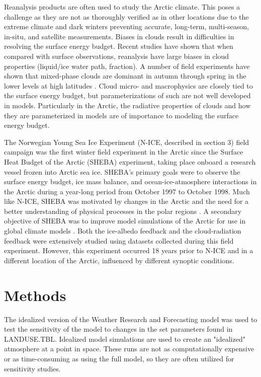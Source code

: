 Reanalysis products are often used to study the Arctic climate. This poses a challenge as they are not as thoroughly verified as in other locations due to the extreme climate and dark winters preventing accurate, long-term, multi-season, in-situ, and satellite measurements. Biases in clouds result in difficulties in resolving the surface energy budget. Recent studies have shown that when compared with surface observations, reanalysis have large biases in cloud properties (liquid/ice water path, fraction). A number of field experiments have shown that mixed-phase clouds are dominant in autumn through spring in the lower levels at high latitudes \citep{intrieri:2002, wang:2005}. Cloud micro- and macrophysics are closely tied to the surface energy budget, but parameterizations of such are not well developed in models. Particularly in the Arctic, the radiative properties of clouds and how they are parameterized in models are of importance to modeling the surface energy budget. 

The  Norwegian Young Sea Ice Experiment (N-ICE, described in section 3) field campaign was the first winter field experiment in the Arctic since the Surface Heat Budget of the Arctic (SHEBA) experiment, taking place onboard a research vessel frozen into Arctic sea ice. SHEBA’s primary goals were to observe the surface energy budget, ice mass balance, and ocean-ice-atmosphere interactions in the Arctic during a year-long period from October 1997 to October 1998. Much like N-ICE, SHEBA was motivated by changes in the Arctic and the need for a better understanding of physical processes in the polar regions \citep{randall:1998}. A secondary objective of SHEBA was to improve model simulations of the Arctic for use in global climate models \citep{uttal:2002}. Both the ice-albedo feedback and the cloud-radiation feedback were extensively studied using datasets collected during this field experiment. However, this experiment occurred 18 years prior to N-ICE and in a different location of the Arctic, influenced by different synoptic conditions. 

\section{Methods}

The idealized version of the Weather Research and Forecasting model was used to test the sensitivity of the model to changes in the set parameters found in LANDUSE.TBL. Idealized model simulations are used to create an "idealized" atmosphere at a point in space. These runs are not as computationally expensive or as time-consuming as using the full model, so they are often utilized for sensitivity studies.

